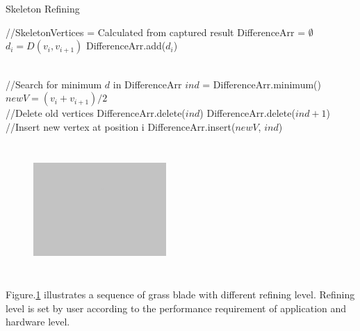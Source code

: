 \documentclass[10pt,journal,compsoc]{IEEEtran}
\begin{document}
    \renewcommand{\algorithmicrequire}{\textbf{Input:}}
    \renewcommand{\algorithmicensure}{\textbf{Output:}}

    \begin{algorithm}
        \caption{Skeleton Refining}
        \label{tbl:skeletonrefining}
        \begin{algorithmic}[1]
            \State //SkeletonVertices = Calculated from captured result
                \State DifferenceArr = $\emptyset$
                    \State $d_i = D(v_{i}, v_{i+1})$
                    \State DifferenceArr.add($d_i$)
                \EndFor

                \\
                \State //Search for minimum $d$ in DifferenceArr
                \State $ind$ = DifferenceArr.minimum()
                \State $newV = (v_{i} + v_{i+1}) /2$
                \\
                \State //Delete old vertices
                \State DifferenceArr.delete($ind$)
                \State DifferenceArr.delete($ind+1$)
                \\
                \State //Insert new vertex at position i
                \State DifferenceArr.insert($newV$, $ind$)

            \EndWhile
        \end{algorithmic}
    \end{algorithm}

\begin{figure}
    \centering
    \includegraphics[width=0.45\textwidth,height=5cm]{figs/test2.jpg}
    \label{fig:skeletonrefining}
\end{figure}

Figure.\ref{fig:skeletonrefining} illustrates a sequence of grass blade with different refining level. Refining level is set by user according to the performance requirement of application and hardware level.
\end{document}
